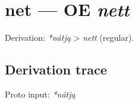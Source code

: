 \documentclass[
  british,
  a4paper,
  openany]{book}
\providecommand{\texorpdfstring}[2]{#1}
\begin{document}
\section{\texorpdfstring{net --- OE
\emph{nett}}{net --- OE nett}}\label{net-oe-nett}


Derivation: \emph{*nátją} \textgreater{} \emph{nett} (regular).

\subsection{Derivation trace}\label{derivation-trace-40}

Proto input: \emph{*nátją}

\begingroup
\setlength{\fboxsep}{6pt}
\end{document}
